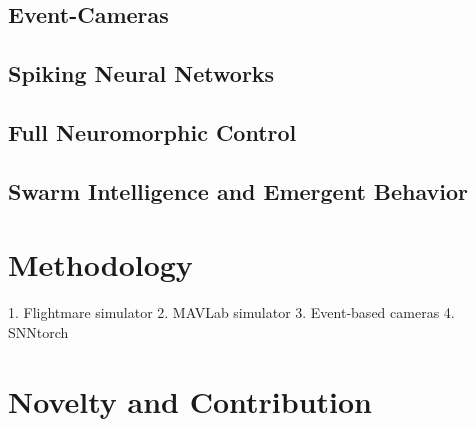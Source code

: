 \documentclass{article}
\begin{document}
\subsection{Event-Cameras}
\subsection{Spiking Neural Networks}
\subsection{Full Neuromorphic Control}
\subsection{Swarm Intelligence and Emergent Behavior}


\section{Methodology}

1. Flightmare simulator
2. MAVLab simulator
3. Event-based cameras
4. SNNtorch


\section{Novelty and Contribution}

\printbibliography[title={\section{References}}]
\end{document}
